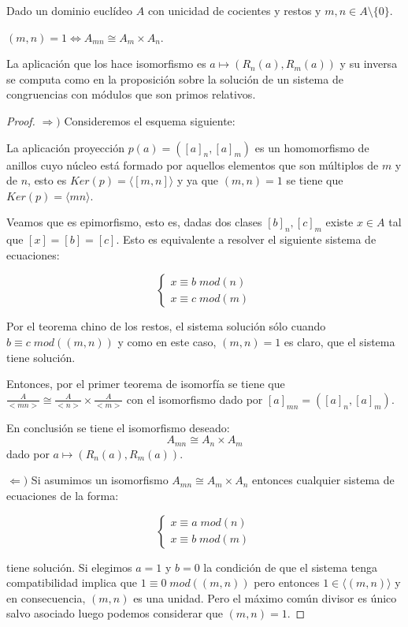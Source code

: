\begin{theorem}
Dado un dominio euclídeo $A$ con unicidad de cocientes y restos y $m,n \in A \setminus \{0\}$. 

$(m,n) = 1 \iff A_{mn} \cong A_m \times A_n$. 

La aplicación que los hace isomorfismo es $a \mapsto (R_n(a),R_m(a))$ y su inversa se computa como en la proposición sobre la solución de un sistema de congruencias con módulos que son primos relativos.
\end{theorem}
\begin{proof}
$\Rightarrow)$ Consideremos el esquema siguiente:


La aplicación proyección $p(a) = ([a]_n,[a]_m)$ es un homomorfismo de anillos cuyo núcleo está formado por aquellos elementos que son múltiplos de $m$ y de $n$, esto es $Ker(p) = \langle [m,n] \rangle$ y ya que $(m,n) = 1$ se tiene que $Ker(p) = \langle mn \rangle$. 

Veamos que es epimorfismo, esto es, dadas dos clases $[b]_n,[c]_m$ existe $x \in A$ tal que $[x] = [b] = [c]$. Esto es equivalente a resolver el siguiente sistema de ecuaciones:

\[   
\begin{cases}
x \equiv b \; mod(n) \\
x \equiv c \; mod(m) 
\end{cases}
\]

Por el teorema chino de los restos, el sistema solución sólo cuando $b \equiv c \; mod((m,n))$ y como en este caso, $(m,n) = 1$ es claro, que el sistema tiene solución.

Entonces, por el primer teorema de isomorfía se tiene que $\frac{A}{<mn>} \cong \frac{A}{<n>} \times \frac{A}{<m>}$ con el isomorfismo dado por $[a]_{mn} = ([a]_n,[a]_m)$. 

En conclusión se tiene el isomorfismo deseado: $$A_{mn} \cong A_n \times A_m$$ dado por $a \mapsto (R_n(a),R_m(a))$. 

$\Leftarrow)$ Si asumimos un isomorfismo $A_{mn} \cong A_m \times A_n$ entonces cualquier sistema de ecuaciones de la forma:

\[   
\begin{cases}
x \equiv a \; mod(n) \\
x \equiv b \; mod(m) 
\end{cases}
\]

tiene solución. Si elegimos $a = 1$ y $b = 0$ la condición de que el sistema tenga compatibilidad implica que $1 \equiv 0 \; mod((m,n))$ pero entonces $1 \in \langle (m,n) \rangle$  y en consecuencia, $(m,n)$ es una unidad. Pero el máximo común divisor es único salvo asociado luego podemos considerar que $(m,n) = 1$.
\end{proof}

